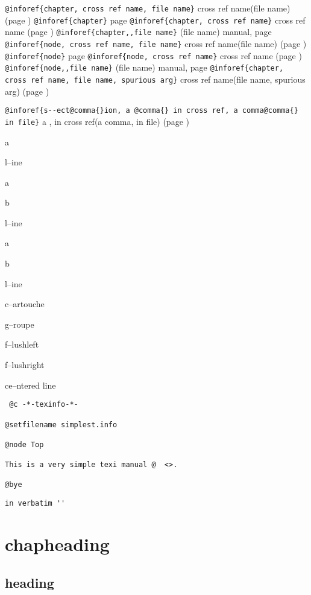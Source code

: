 \documentclass{book}
\begin{document}
\texttt{@inforef\{chapter, cross ref name, file name\}} cross ref name(file name) (page \pageref{anchor:chapter})
\texttt{@inforef\{chapter\}} page \pageref{anchor:chapter}
\texttt{@inforef\{chapter, cross ref name\}} cross ref name (page \pageref{anchor:chapter})
\texttt{@inforef\{chapter,,file name\}} (file name) manual, page \pageref{anchor:chapter}
\texttt{@inforef\{node, cross ref name, file name\}} cross ref name(file name) (page \pageref{anchor:node})
\texttt{@inforef\{node\}} page \pageref{anchor:node}
\texttt{@inforef\{node, cross ref name\}} cross ref name (page \pageref{anchor:node})
\texttt{@inforef\{node,,file name\}} (file name) manual, page \pageref{anchor:node}
\texttt{@inforef\{chapter, cross ref name, file name, spurious arg\}} cross ref name(file name, spurious arg) (page \pageref{anchor:chapter})


\texttt{@inforef\{s{-}{-}ect@comma\{\}ion, a @comma\{\} in cross
ref, a comma@comma\{\} in file\}}
a , in cross
ref(a comma, in file) (page \pageref{anchor:s_002d_002dect_002cion})


a


l--ine


a


b


l--ine


a


b


l--ine


c--artouche


g--roupe


f--lushleft


f--lushright


ce--ntered line

\begin{verbatim}
 @c -*-texinfo-*-

@setfilename simplest.info

@node Top

This is a very simple texi manual @  <>.

@bye
\end{verbatim}

\begin{verbatim}
in verbatim ''
\end{verbatim}

\chapter*{chapheading}

\section*{heading}
\end{document}
